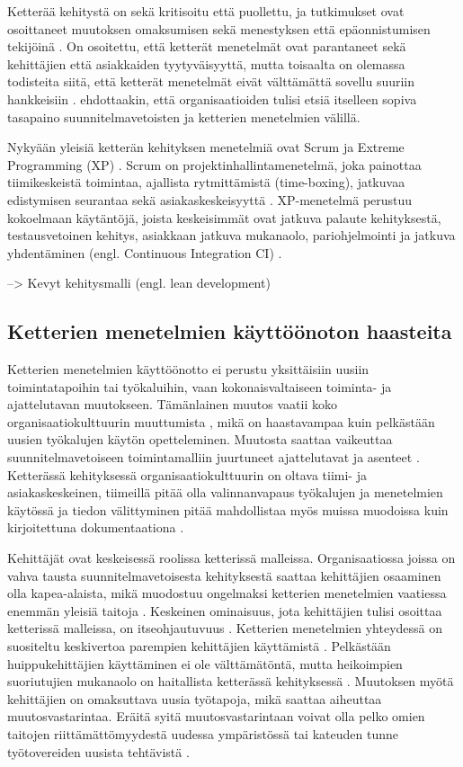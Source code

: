 Ketterää kehitystä on sekä kritisoitu että puollettu, ja tutkimukset ovat
osoittaneet muutoksen omaksumisen sekä menestyksen että epäonnistumisen
tekijöinä . On osoitettu, että ketterät menetelmät ovat
parantaneet sekä kehittäjien että asiakkaiden tyytyväisyyttä, mutta toisaalta on
olemassa todisteita siitä, että ketterät menetelmät eivät välttämättä sovellu
suuriin hankkeisiin .  ehdottaakin, että
organisaatioiden tulisi etsiä itselleen sopiva tasapaino suunnitelmavetoisten ja
ketterien menetelmien välillä.

Nykyään yleisiä ketterän kehityksen menetelmiä ovat Scrum ja Extreme Programming
(XP) . Scrum on projektinhallintamenetelmä, joka painottaa
tiimikeskeistä toimintaa, ajallista rytmittämistä (time-boxing), jatkuvaa
edistymisen seurantaa sekä asiakaskeskeisyyttä .
XP-menetelmä perustuu kokoelmaan käytäntöjä, joista keskeisimmät ovat jatkuva
palaute kehityksestä, testausvetoinen kehitys, asiakkaan jatkuva mukanaolo,
pariohjelmointi ja jatkuva yhdentäminen (engl. Continuous Integration
CI) .

--> Kevyt kehitysmalli (engl. lean development)

\subsection{Ketterien menetelmien käyttöönoton haasteita}

Ketterien menetelmien käyttöönotto ei perustu yksittäisiin uusiin
toimintatapoihin tai työkaluihin, vaan kokonaisvaltaiseen toiminta- ja
ajattelutavan muutokseen. Tämänlainen muutos vaatii koko organisaatiokulttuurin
muuttumista , mikä on haastavampaa kuin pelkästään uusien
työkalujen käytön opetteleminen. Muutosta saattaa vaikeuttaa
suunnitelmavetoiseen toimintamalliin juurtuneet ajattelutavat ja asenteet
. Ketterässä kehityksessä organisaatiokulttuurin
on oltava tiimi- ja asiakaskeskeinen, tiimeillä pitää olla valinnanvapaus
työkalujen ja menetelmien käytössä ja tiedon välittyminen pitää mahdollistaa
myös muissa muodoissa kuin kirjoitettuna dokumentaationa .

Kehittäjät ovat keskeisessä roolissa ketterissä malleissa. Organisaatiossa
joissa on vahva tausta suunnitelmavetoisesta kehityksestä saattaa kehittäjien
osaaminen olla kapea-alaista, mikä muodostuu ongelmaksi ketterien menetelmien
vaatiessa enemmän yleisiä taitoja . Keskeinen ominaisuus,
jota kehittäjien tulisi osoittaa ketterissä malleissa, on itseohjautuvuus
. Ketterien menetelmien yhteydessä on suositeltu keskivertoa
parempien kehittäjien käyttämistä . Pelkästään
huippukehittäjien käyttäminen ei ole välttämätöntä, mutta heikoimpien
suoriutujien mukanaolo on haitallista ketterässä kehityksessä
. Muutoksen myötä kehittäjien on omaksuttava uusia
työtapoja, mikä saattaa aiheuttaa muutosvastarintaa. Eräitä syitä
muutosvastarintaan voivat olla pelko omien taitojen riittämättömyydestä uudessa
ympäristössä tai kateuden tunne työtovereiden uusista tehtävistä
.

